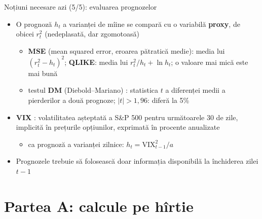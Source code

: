 \begin{frame}{Noțiuni necesare azi (5/5): evaluarea prognozelor}
\itemsize{\small}
\begin{itemize}
    \item O prognoză $h_t$ a varianței de mîine se compară cu o variabilă \textbf{proxy}, de obicei $r_t^2$ (nedeplasată, dar zgomotoasă)
    \begin{itemize}
        \item \textbf{MSE} (mean squared error, eroarea pătratică medie): media lui $(r_t^2 - h_t)^2$; \textbf{QLIKE}: media lui $r_t^2/h_t + \ln h_t$; o valoare mai mică este mai bună 
        \item testul \textbf{DM} (Diebold--Mariano) : statistica $t$ a diferenței medii a pierderilor a două prognoze; $|t| > 1{,}96$: diferă la 5\%
    \end{itemize}
    \item \textbf{VIX} : volatilitatea așteptată a S\&P 500 pentru următoarele 30 de zile, implicită în prețurile opțiunilor, exprimată în procente anualizate
    \begin{itemize}
        \item ca prognoză a varianței zilnice: $h_t = \mathrm{VIX}_{t-1}^2/a$
    \end{itemize}
    \item Prognozele trebuie să folosească doar informația disponibilă la închiderea zilei $t-1$
\end{itemize}
\end{frame}


\section{Partea A: calcule pe hîrtie}

